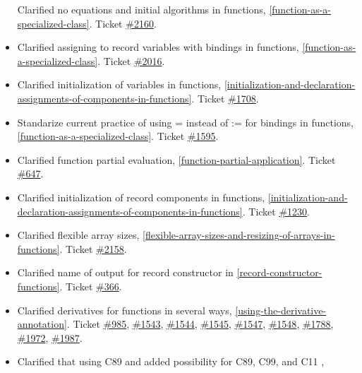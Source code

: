 \begin{itemize}
  Clarified no equations and initial algorithms in functions, 
  \autoref{function-as-a-specialized-class}. Ticket
  \href{https://trac.modelica.org/Modelica/ticket/2160}{\#2160}.
\item
  Clarified assigning to record variables with bindings in functions,
  \autoref{function-as-a-specialized-class}. Ticket
  \href{https://trac.modelica.org/Modelica/ticket/2016}{\#2016}.
\item
  Clarified initialization of variables in functions, \autoref{initialization-and-declaration-assignments-of-components-in-functions}.
  Ticket \href{https://trac.modelica.org/Modelica/ticket/1708}{\#1708}.
\item
  Standarize current practice of using = instead of := for bindings in
  functions, \autoref{function-as-a-specialized-class}. Ticket
  \href{https://trac.modelica.org/Modelica/ticket/1595}{\#1595}.
\item
  Clarified function partial evaluation, \autoref{function-partial-application}. Ticket
  \href{https://trac.modelica.org/Modelica/ticket/647}{\#647}.
\item
  Clarified initialization of record components in functions, 
  \autoref{initialization-and-declaration-assignments-of-components-in-functions}. Ticket
  \href{https://trac.modelica.org/Modelica/ticket/1230}{\#1230}.
\item
  Clarified flexible array sizes, \autoref{flexible-array-sizes-and-resizing-of-arrays-in-functions}. Ticket
  \href{https://trac.modelica.org/Modelica/ticket/2158}{\#2158}.
\item
  Clarified name of output for record constructor in \autoref{record-constructor-functions}.
  Ticket \href{https://trac.modelica.org/Modelica/ticket/366}{\#366}.
\item
  Clarified derivatives for functions in several ways, \autoref{using-the-derivative-annotation}.
  Ticket \href{https://trac.modelica.org/Modelica/ticket/985}{\#985},
  \href{https://trac.modelica.org/Modelica/ticket/1543}{\#1543},
  \href{https://trac.modelica.org/Modelica/ticket/1544}{\#1544},
  \href{https://trac.modelica.org/Modelica/ticket/1545}{\#1545},
  \href{https://trac.modelica.org/Modelica/ticket/1547}{\#1547},
  \href{https://trac.modelica.org/Modelica/ticket/1548}{\#1548},
  \href{https://trac.modelica.org/Modelica/ticket/1788}{\#1788},
  \href{https://trac.modelica.org/Modelica/ticket/1972}{\#1972},
  \href{https://trac.modelica.org/Modelica/ticket/1987}{\#1987}.
\item
  Clarified that using C89 and added possibility for C89, C99, and C11 ,

\end{itemize}
